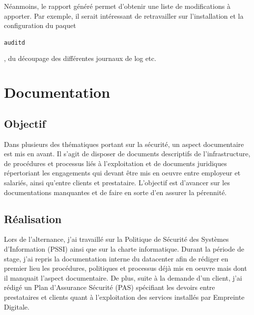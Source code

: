 \documentclass[12pt, a4paper, twoside]{article}
\begin{document}
Néanmoins, le rapport généré permet d'obtenir une liste de modifications à apporter.
Par exemple, il serait intéressant de retravailler sur l'installation et la configuration du paquet \begin{code}\texttt{auditd}\end{code}, du découpage des différentes journaux de log etc.

\newpage
\section{Documentation}
\subsection{Objectif}
Dans plusieurs des thématiques portant sur la sécurité, un aspect documentaire est mis en avant. 
Il s'agit de disposer de documents descriptifs de l'infrastructure, de procédures et processus liés à l'exploitation et de documents juridiques répertoriant les engagements qui devant être mis en oeuvre entre employeur et salariés, ainsi qu'entre clients et prestataire. 
L'objectif est d'avancer sur les documentations manquantes et de faire en sorte d'en assurer la pérennité.

\subsection{Réalisation}
Lors de l'alternance, j'ai travaillé sur la Politique de Sécurité des Systèmes d'Information (\gls{PSSI}) ainsi que sur la charte informatique. 
Durant la période de stage, j'ai repris la documentation interne du datacenter afin de rédiger en premier lieu les procédures, politiques et processus déjà mis en oeuvre mais dont il manquait l'aspect documentaire.
De plus, suite à la demande d'un client, j'ai rédigé un Plan d'Assurance Sécurité (\gls{PAS}) spécifiant les devoirs entre prestataires et clients quant à l'exploitation des services installés par Empreinte Digitale. \\
\end{document}
